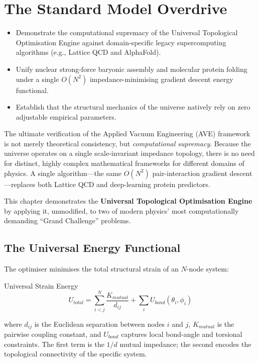 \chapter{The Standard Model Overdrive}
\label{ch:overdrive}

\begin{objectivebox}
\begin{itemize}
    \item Demonstrate the computational supremacy of the Universal Topological Optimisation Engine against domain-specific legacy supercomputing algorithms (e.g., Lattice QCD and AlphaFold).
    \item Unify nuclear strong-force baryonic assembly and molecular protein folding under a single $O(N^2)$ impedance-minimising gradient descent energy functional.
    \item Establish that the structural mechanics of the universe natively rely on zero adjustable empirical parameters.
\end{itemize}
\end{objectivebox}

The ultimate verification of the Applied Vacuum Engineering (AVE) framework is not merely theoretical consistency, but \textit{computational supremacy}. Because the universe operates on a single scale-invariant impedance topology, there is no need for distinct, highly complex mathematical frameworks for different domains of physics. A single algorithm---the same $O(N^2)$ pair-interaction gradient descent---replaces both Lattice QCD and deep-learning protein predictors.

This chapter demonstrates the \textbf{Universal Topological Optimisation Engine} by applying it, unmodified, to two of modern physics' most computationally demanding ``Grand Challenge'' problems.

\section{The Universal Energy Functional}

The optimiser minimises the total structural strain of an $N$-node system:
\begin{resultbox}{Universal Strain Energy}
\begin{equation}
    U_{total} = \sum_{i < j}^{N} \frac{K_{mutual}}{d_{ij}} + \sum_{i} U_{bond}(\theta_i, \phi_i)
    \label{eq:universal_energy}
\end{equation}
\end{resultbox}
\noindent where $d_{ij}$ is the Euclidean separation between nodes $i$ and $j$, $K_{mutual}$ is the pairwise coupling constant, and $U_{bond}$ captures local bond-angle and torsional constraints. The first term is the $1/d$ mutual impedance; the second encodes the topological connectivity of the specific system.

